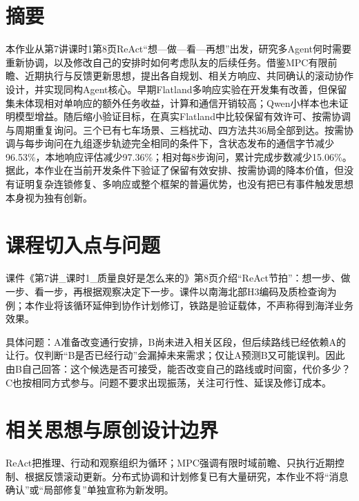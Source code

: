 \hypertarget{ux6458ux8981}{%
\chapter{摘要}\label{ux6458ux8981}}

本作业从第7讲课时1第8页ReAct``想---做---看---再想''出发，研究多Agent何时需要重新协调，以及修改自己的安排时如何考虑队友的后续任务。借鉴MPC有限前瞻、近期执行与反馈更新思想，提出各自规划、相关方响应、共同确认的滚动协作设计，并实现同构Agent核心。早期Flatland多响应实验在开发集有改善，但保留集未体现相对单响应的额外任务收益，计算和通信开销较高；Qwen小样本也未证明模型增益。随后缩小验证目标，在真实Flatland中比较保留有效许可、按需协调与周期重复询问。三个已有七车场景、三档扰动、四方法共36局全部到达。按需协调与每步询问在九组逐步轨迹完全相同的条件下，含状态发布的通信字节减少96.53\%，本地响应评估减少97.36\%；相对每8步询问，累计完成步数减少15.06\%。据此，本作业在当前开发条件下验证了保留有效安排、按需协调的降本价值，但没有证明复杂连锁修复、多响应或整个框架的普遍优势，也没有把已有事件触发思想本身视为独有创新。

\hypertarget{ux8bfeux7a0bux5207ux5165ux70b9ux4e0eux95eeux9898}{%
\chapter{课程切入点与问题}\label{ux8bfeux7a0bux5207ux5165ux70b9ux4e0eux95eeux9898}}

课件《第7讲\_课时1\_质量良好是怎么来的》第8页介绍``ReAct节拍''：想一步、做一步、看一步，再根据观察决定下一步。课件以南海北部H3编码及质检查询为例；本作业将该循环延伸到协作计划修订，铁路是验证载体，不声称得到海洋业务效果。

具体问题：A准备改变通行安排，B尚未进入相关区段，但后续路线已经依赖A的让行。仅判断``B是否已经行动''会漏掉未来需求；仅让A预测B又可能误判。因此由B自己回答：这个候选是否可接受，能否改变自己的路线或时间窗，代价多少？C也按相同方式参与。问题不要求出现振荡，关注可行性、延误及修订成本。

\hypertarget{ux76f8ux5173ux601dux60f3ux4e0eux539fux521bux8bbeux8ba1ux8fb9ux754c}{%
\chapter{相关思想与原创设计边界}\label{ux76f8ux5173ux601dux60f3ux4e0eux539fux521bux8bbeux8ba1ux8fb9ux754c}}

ReAct把推理、行动和观察组织为循环；MPC强调有限时域前瞻、只执行近期控制、根据反馈滚动更新。分布式协调和计划修复已有大量研究，本作业不将``消息确认''或``局部修复''单独宣称为新发明。


